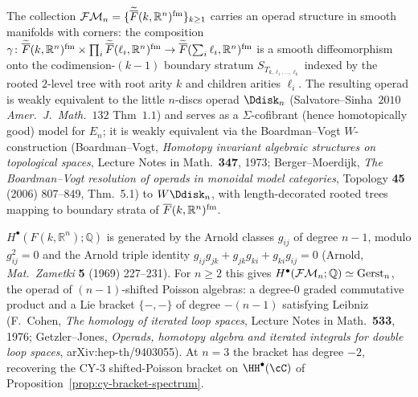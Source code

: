 \begin{theorem}
\label{thm:cy-cat-fm-operad}
The collection
$\mathcal{FM}_n = \{\widetilde{\overline{F}}(k, \mathbb{R}^n)^{\mathrm{fm}}\}_{k \geq 1}$
carries an operad structure in smooth manifolds with corners: the
composition
$\gamma \colon \widetilde{\overline{F}}(k, \mathbb{R}^n)^{\mathrm{fm}} \times
 \prod_i \widetilde{\overline{F}}(\ell_i, \mathbb{R}^n)^{\mathrm{fm}}
 \to \widetilde{\overline{F}}(\sum_i \ell_i, \mathbb{R}^n)^{\mathrm{fm}}$
is a smooth diffeomorphism onto the codimension-$(k-1)$ boundary
stratum $S_{T_{k, \ell_1, \ldots, \ell_k}}$ indexed by the rooted
$2$-level tree with root arity $k$ and children arities $\ell_i$.
The resulting operad is weakly equivalent to the little $n$-discs
operad $\Ddisk_n$ (Salvatore--Sinha~$2010$ \emph{Amer.~J.~Math.}~$132$
Thm~$1.1$) and serves as a $\Sigma$-cofibrant (hence homotopically
good) model for $E_n$; it is weakly equivalent via the
Boardman--Vogt $W$-construction
(Boardman--Vogt, \emph{Homotopy invariant algebraic structures on topological spaces}, Lecture Notes in Math.\ \textbf{347}, 1973; Berger--Moerdijk, \emph{The Boardman--Vogt resolution of operads in monoidal model categories}, Topology \textbf{45} (2006) 807--849, Thm.\ 5.1) to
$W \Ddisk_n$, with length-decorated rooted trees mapping to boundary
strata of $\overline{F}(k, \mathbb{R}^n)^{\mathrm{fm}}$.
\end{theorem}

\begin{example}
\label{ex:cy-cat-fm-cohomology}
$H^\bullet(F(k, \mathbb{R}^n); \mathbb{Q})$ is generated by the
Arnold classes $g_{ij}$ of degree $n - 1$, modulo $g_{ij}^2 = 0$
and the Arnold triple identity
$g_{ij} g_{jk} + g_{jk} g_{ki} + g_{ki} g_{ij} = 0$
(Arnold, \emph{Mat.\ Zametki} \textbf{5} (1969) 227--231). For $n \geq 2$ this gives
$H^\bullet(\mathcal{FM}_n; \mathbb{Q}) \simeq \mathrm{Gerst}_n$, the operad of
$(n - 1)$-shifted Poisson algebras: a degree-$0$ graded commutative
product and a Lie bracket $\{-, -\}$ of degree $-(n - 1)$ satisfying
Leibniz (F.~Cohen, \emph{The homology of iterated loop spaces}, Lecture Notes in Math.\ \textbf{533}, 1976; Getzler--Jones, \emph{Operads, homotopy algebra and iterated integrals for double loop spaces}, arXiv:hep-th/9403055). At $n = 3$ the bracket
has degree $-2$, recovering the CY-$3$ shifted-Poisson bracket on
$\HH^\bullet(\cC)$ of Proposition~\ref{prop:cy-bracket-spectrum}.
\end{example}

